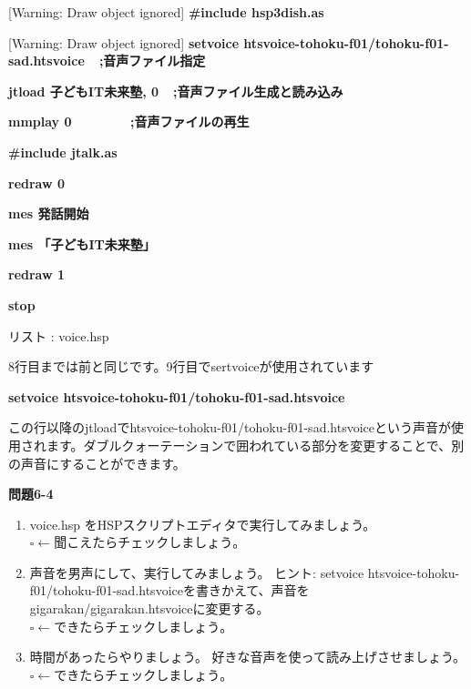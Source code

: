 \documentclass[a4paper,dvipdfmx]{jarticle}
\newcommand\liststyleLvii{%
\renewcommand\theenumi{\arabic{enumi}}
\renewcommand\theenumii{\arabic{enumii}}
\renewcommand\theenumiii{\arabic{enumiii}}
\renewcommand\theenumiv{\arabic{enumiv}}
\renewcommand\labelenumi{\theenumi.}
\renewcommand\labelenumii{\theenumii.}
\renewcommand\labelenumiii{\theenumiii.}
\renewcommand\labelenumiv{\theenumiv.}
}
\newcounter{List}
\renewcommand\theList{\arabic{List}}
\begin{document}
\begin{minipage}{17.006cm}
[Warning: Draw object ignored]{\ttfamily\bfseries
\#include {\textquotedbl}hsp3dish.as{\textquotedbl}}

\begin{minipage}{16.665cm}
[Warning: Draw object ignored]{\ttfamily\bfseries
setvoice
{\textquotedbl}htsvoice-tohoku-f01/tohoku-f01-sad.htsvoice{\textquotedbl}\ \ \textcolor[rgb]{0.0,0.0,0.6}{;音声ファイル指定}}

{\ttfamily\bfseries
jtload {\textquotedbl}子どもIT未来塾{\textquotedbl},
0\ \ \textcolor[rgb]{0.0,0.0,0.6}{;音声ファイル生成と読み込み}}

{\ttfamily\bfseries
mmplay 0\ \ \ \ \ \ \ \ \textcolor[rgb]{0.0,0.0,0.6}{;音声ファイルの再生}}
\end{minipage}{\ttfamily\bfseries
\#include {\textquotedbl}jtalk.as{\textquotedbl}}


\bigskip

{\ttfamily\bfseries
redraw 0}

{\ttfamily\bfseries
mes {\textquotedbl}発話開始{\textquotedbl}}

{\ttfamily\bfseries
mes {\textquotedbl}「子どもIT未来塾」{\textquotedbl}}

{\ttfamily\bfseries
redraw 1}


\bigskip


\bigskip

{\ttfamily\bfseries
stop}

{\upshape
リスト \stepcounter{List}{\theList}: voice.hsp}
\end{minipage}

{
8行目までは前と同じです。9行目でsertvoiceが使用されています}

{\ttfamily\bfseries
setvoice {\textquotedbl}htsvoice-tohoku-f01/tohoku-f01-sad.htsvoice{\textquotedbl}}

{
この行以降のjtloadでhtsvoice-tohoku-f01/tohoku-f01-sad.htsvoiceという声音が使用されます。ダブルクォーテーションで囲われている部分を変更することで、別の声音にすることができます。}

{\bfseries
問題6-4}

\liststyleLvii
\begin{enumerate}
\item {
voice.hsp
をHSPスクリプトエディタで実行してみましょう。\newline
${\square}\leftarrow
聞こえたらチェックしましょう。$}
\item {
声音を男声にして、実行してみましょう。\newline
ヒント: setvoice
{\textquotedbl}htsvoice-tohoku-f01/tohoku-f01-sad.htsvoice{\textquotedbl}を書きかえて、声音をgigarakan/gigarakan.htsvoiceに変更する。\newline
${\square}\leftarrow
できたらチェックしましょう。$}
\item {
時間があったらやりましょう。\newline
好きな音声を使って読み上げさせましょう。\newline
${\square}\leftarrow
できたらチェックしましょう。$}
\end{enumerate}
\end{document}

